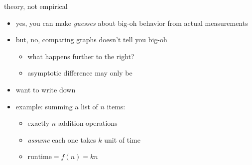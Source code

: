 \begin{frame}{theory, not empirical}
    \begin{itemize}
    \item yes, you can make \textit{guesses} about big-oh behavior from actual measurements
    \item but, no, comparing graphs doesn't tell you big-oh
    \begin{itemize}
        \item what happens further to the right?
        \item asymptotic difference may only be 
    \end{itemize}
    \vspace{.5cm}
    \item want to write down 
    \item<2-> example: summing a list of $n$ items:
        \begin{itemize}
        \item exactly $n$ addition operations
        \item \textit{assume} each one takes $k$ unit of time
        \item $\text{runtime} = f(n) = kn$
        \end{itemize}
    \end{itemize}
\end{frame}

